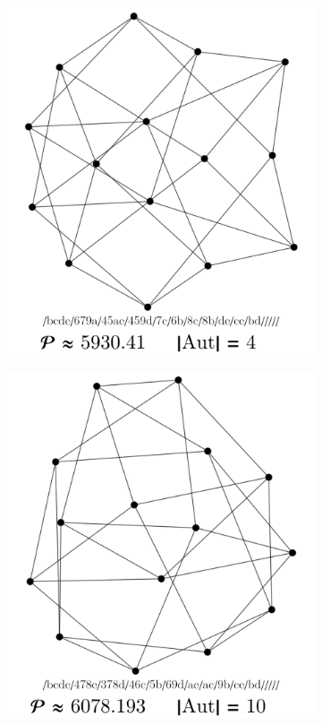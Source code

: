 \documentclass[12pt,a4paper]{article}
\renewcommand{\|}{\rule[-0.4ex]{0.2ex}{1.2em}}
\begin{document}
\begin{figure}[htb]
	\begin{subfigure}[b]{.24 \textwidth}
		\includegraphics[width=\linewidth]{smallest_13_1}
		\subcaption{}
	\end{subfigure}
	\begin{subfigure}[b]{.24 \textwidth}
		\includegraphics[width=\linewidth]{smallest_13_2}

\end{subfigure}
\end{figure}
\end{document}
